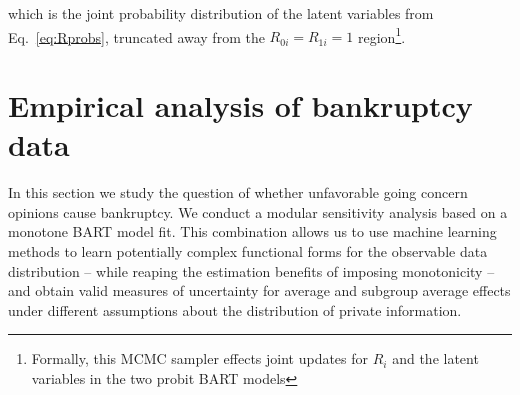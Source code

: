 \documentclass[aoas,preprint, 11pt, dvipsnames, table, x11name]{imsart}
\theoremstyle{remark}
\begin{document}
which is the joint probability distribution of the latent variables from Eq.~\eqref{eq:Rprobs}, truncated away from the $R_{0i} = R_{1i}=1$ region\footnote{Formally, this MCMC sampler effects joint updates for $R_i$ and the latent variables in the two probit BART models}.





\section{Empirical analysis of bankruptcy data}\label{empirical_section}
In this section we study the question of whether unfavorable going concern opinions cause bankruptcy. We conduct a modular sensitivity analysis based on a monotone BART model fit. This combination allows us to use machine learning methods to learn potentially complex functional forms for the observable data distribution -- while reaping the estimation benefits of imposing monotonicity -- and obtain valid measures of uncertainty for average and subgroup average effects under different assumptions about the distribution of private information.
\end{document}
